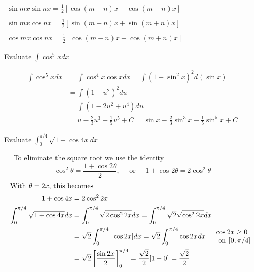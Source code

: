 \begin{note}\newline
	$\begin{array}{l}
		\sin m x \sin n x=\frac{1}{2}[\cos (m-n) x-\cos (m+n) x] \\\\
		\sin m x \cos n x=\frac{1}{2}[\sin (m-n) x+\sin (m+n) x] \\\\
		\cos m x \cos n x=\frac{1}{2}[\cos (m-n) x+\cos (m+n) x]
	\end{array}$
\end{note}
\begin{exercise}
	Evaluate $\int \cos ^{5} x d x$
\end{exercise}
\begin{answer}
	\begin{align*} 
	\int \cos ^{5} x d x &=\int \cos ^{4} x \cos x d x=\int\left(1-\sin ^{2} x\right)^{2} d(\sin x) \\ &=\int\left(1-u^{2}\right)^{2} d u \\ &=\int\left(1-2 u^{2}+u^{4}\right) d u \\ &=u-\frac{2}{3} u^{3}+\frac{1}{5} u^{5}+C=\sin x-\frac{2}{3} \sin ^{3} x+\frac{1}{5} \sin ^{5} x+C 
	\end{align*}
\end{answer}
\begin{exercise}
	Evaluate $\int_{0}^{\pi / 4} \sqrt{1+\cos 4 x} d x$
\end{exercise}
\begin{answer}
 $\quad$ To eliminate the square root we use the identity
	$$
	\cos ^{2} \theta=\frac{1+\cos 2 \theta}{2}, \quad \text { or } \quad 1+\cos 2 \theta=2 \cos ^{2} \theta
	$$
\begin{align*}
		\intertext{With $\theta=2 x$, this becomes}
	1+\cos 4 x&=2 \cos ^{2} 2 x\\
	\int_{0}^{\pi / 4} \sqrt{1+\cos 4 x} d x &=\int_{0}^{\pi / 4} \sqrt{2 \cos ^{2} 2 x} d x=\int_{0}^{\pi / 4} \sqrt{2} \sqrt{\cos ^{2} 2 x} d x \\
		&=\sqrt{2} \int_{0}^{\pi / 4}|\cos 2 x| d x=\sqrt{2} \int_{0}^{\pi / 4} \cos 2 x d x \quad \begin{array}{l}
			\cos 2 x \geq 0 \\
			\text { on }[0, \pi / 4]
		\end{array} \\
		&=\sqrt{2}\left[\frac{\sin 2 x}{2}\right]_{0}^{\pi / 4}=\frac{\sqrt{2}}{2}[1-0]=\frac{\sqrt{2}}{2}
	\end{align*}
\end{answer}
